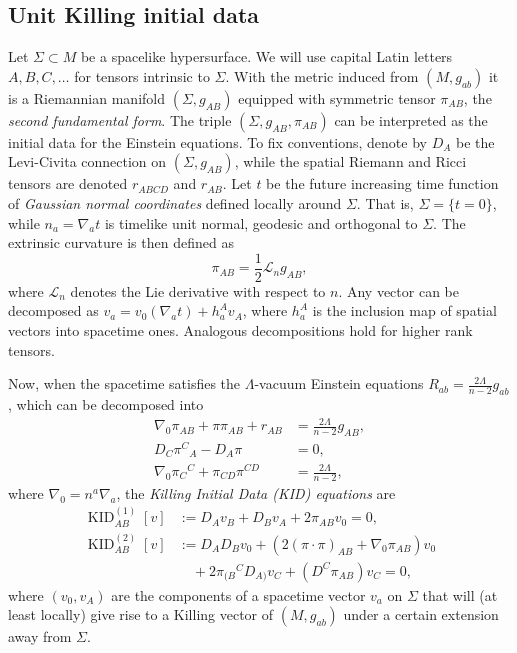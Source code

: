 \documentclass[a4paper]{article}
\theoremstyle{remark}
\newcommand{\La}{\Lambda}
\newcommand{\KIDi}{\operatorname{KID}^{(1)}}
\newcommand{\KIDii}{\operatorname{KID}^{(2)}}
\begin{document}
\subsection{Unit Killing initial data} \label{sec:uKID}

Let $\Sigma \subset M$ be a spacelike hypersurface. We will use capital
Latin letters $A, B, C, \dots$ for tensors intrinsic to $\Sigma$. With
the metric induced from $(M,g_{ab})$ it is a Riemannian manifold
$(\Sigma, g_{AB})$ equipped with symmetric tensor $\pi_{AB}$, the
\emph{second fundamental form}.
The triple $(\Sigma, g_{AB}, \pi_{AB})$ can be interpreted as the
initial data for the Einstein equations.
To fix conventions, denote by $D_A$ be the Levi-Civita connection on
$(\Sigma,g_{AB})$, while the spatial Riemann and Ricci tensors are
denoted $r_{ABCD}$ and $r_{AB}$. Let $t$ be the future increasing time
function of \emph{Gaussian normal coordinates} defined locally around
$\Sigma$. That is, $\Sigma = \{ t = 0 \}$, while $n_a = \nabla_a t$ is
timelike unit normal, geodesic and orthogonal to $\Sigma$. The extrinsic
curvature is then defined as  
\begin{equation}
	\pi_{AB} = \frac12 \mathcal{L}_n g_{AB} ,
\end{equation}
where $\mathcal{L}_n$ denotes the Lie derivative with respect to $n$.
Any vector can be decomposed as $v_a = v_0
(\nabla_a t) + h_a^A v_A$, where $h_a^A$ is the inclusion map of spatial
vectors into spacetime ones. Analogous decompositions hold for higher
rank tensors.

Now, when the spacetime satisfies the $\La$-vacuum Einstein equations
$R_{ab} = \frac{2\La}{n-2} g_{ab}$, which can be decomposed into 
\begin{equation} \label{eq:La-vac}
\begin{aligned}
	\nabla_0 \pi_{AB} + \pi \pi_{AB} + r_{AB} &= \frac{2\La}{n-2} g_{AB} , \\
	D_C \pi^C{}_A - D_A \pi &= 0 , \\
	\nabla_0 \pi_C{}^C + \pi_{CD} \pi^{CD} &= \frac{2\La}{n-2} ,
\end{aligned}
\end{equation}
where $\nabla_0 = n^a \nabla_a$, the \emph{Killing
Initial Data (KID) equations} are~\cite[Eq.(20)]{khgp-cykid}
\begin{equation} \label{eq:KID}
\begin{aligned}
	\KIDi_{AB}[v] &:= D_A v_B + D_B v_A + 2\pi_{AB} v_0 = 0 ,
	\\
	\KIDii_{AB}[v] &:= D_{A} D_{B} v_{0}
	+ (2(\pi\cdot\pi)_{A B} + \nabla_0 \pi_{AB}) v_0 \\
	& \quad {}
	+ 2 \pi_{(B}{}^{C} D_{A)} v_C
	+ (D^{C}{\pi_{A B}}) v_{C} = 0 ,
\end{aligned}
\end{equation}
where $(v_0, v_A)$ are the components of a spacetime vector $v_a$ on
$\Sigma$ that will (at least locally) give rise to a Killing vector of
$(M,g_{ab})$ under a certain extension away from $\Sigma$.
\end{document}
